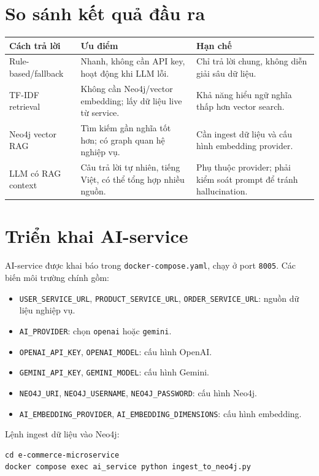 \documentclass[12pt,a4paper]{report}
\begin{document}
\section{So sánh kết quả đầu ra}
\begin{longtable}{p{3.2cm}p{5.1cm}p{5.1cm}}
\toprule
\textbf{Cách trả lời} & \textbf{Ưu điểm} & \textbf{Hạn chế} \\
\midrule
Rule-based/fallback & Nhanh, không cần API key, hoạt động khi LLM lỗi. & Chỉ trả lời chung, không diễn giải sâu dữ liệu. \\
\midrule
TF-IDF retrieval & Không cần Neo4j/vector embedding; lấy dữ liệu live từ service. & Khả năng hiểu ngữ nghĩa thấp hơn vector search. \\
\midrule
Neo4j vector RAG & Tìm kiếm gần nghĩa tốt hơn; có graph quan hệ nghiệp vụ. & Cần ingest dữ liệu và cấu hình embedding provider. \\
\midrule
LLM có RAG context & Câu trả lời tự nhiên, tiếng Việt, có thể tổng hợp nhiều nguồn. & Phụ thuộc provider; phải kiểm soát prompt để tránh hallucination. \\
\bottomrule
\end{longtable}

\section{Triển khai AI-service}
AI-service được khai báo trong \texttt{docker-compose.yaml}, chạy ở port \texttt{8005}. Các biến môi trường chính gồm:
\begin{itemize}
  \item \texttt{USER\_SERVICE\_URL}, \texttt{PRODUCT\_SERVICE\_URL}, \texttt{ORDER\_SERVICE\_URL}: nguồn dữ liệu nghiệp vụ.
  \item \texttt{AI\_PROVIDER}: chọn \texttt{openai} hoặc \texttt{gemini}.
  \item \texttt{OPENAI\_API\_KEY}, \texttt{OPENAI\_MODEL}: cấu hình OpenAI.
  \item \texttt{GEMINI\_API\_KEY}, \texttt{GEMINI\_MODEL}: cấu hình Gemini.
  \item \texttt{NEO4J\_URI}, \texttt{NEO4J\_USERNAME}, \texttt{NEO4J\_PASSWORD}: cấu hình Neo4j.
  \item \texttt{AI\_EMBEDDING\_PROVIDER}, \texttt{AI\_EMBEDDING\_DIMENSIONS}: cấu hình embedding.
\end{itemize}

Lệnh ingest dữ liệu vào Neo4j:
\begin{lstlisting}[style=code,caption={Ingest dữ liệu e-commerce vào Neo4j}]
cd e-commerce-microservice
docker compose exec ai_service python ingest_to_neo4j.py
\end{lstlisting}
\end{document}
